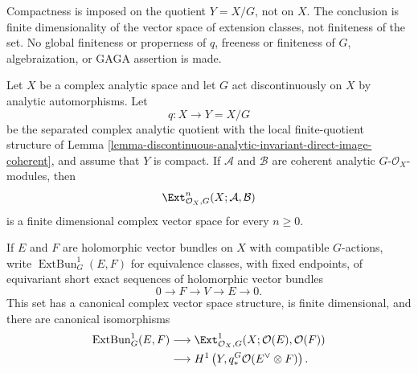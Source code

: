 \begin{lemma}
\label{lemma-compact-analytic-quotient-equivariant-ext-finite-dimensional}
\begin{reference}
\cite[Chapter V, \S 5.6, p. 219]{Tohoku}
\cite[Hauptsatz I, p. 57]{Grauert-direct-image}
\end{reference}
\begin{history}
Compactness is imposed on the quotient $Y=X/G$, not on $X$. The conclusion
is finite dimensionality of the vector space of extension classes, not
finiteness of the set. No global finiteness or properness of $q$, freeness or
finiteness of $G$, algebraization, or GAGA assertion is made.
\end{history}
Let $X$ be a complex analytic space and let $G$ act discontinuously on $X$
by analytic automorphisms. Let
$$
q:X\longrightarrow Y=X/G
$$
be the separated complex analytic quotient with the local finite-quotient
structure of Lemma
\ref{lemma-discontinuous-analytic-invariant-direct-image-coherent}, and
assume that $Y$ is compact. If $\mathcal A$ and $\mathcal B$ are coherent
analytic $G$-$\mathcal O_X$-modules, then
$$
\Ext^n_{\mathcal O_X,G}(X;\mathcal A,\mathcal B)
$$
is a finite dimensional complex vector space for every $n\geq 0$.

If $E$ and $F$ are holomorphic vector bundles on $X$ with compatible
$G$-actions, write $\operatorname{ExtBun}^1_G(E,F)$ for equivalence classes,
with fixed endpoints, of equivariant short exact sequences of holomorphic
vector bundles
$$
0\longrightarrow F\longrightarrow V\longrightarrow E\longrightarrow 0.
$$
This set has a canonical complex vector space structure, is finite
dimensional, and there are canonical isomorphisms
$$
\begin{aligned}
\operatorname{ExtBun}^1_G(E,F)
&\longrightarrow
\Ext^1_{\mathcal O_X,G}
  (X;\mathcal O(E),\mathcal O(F)) \\
&\longrightarrow
H^1\left(Y,q_*^G\mathcal O(E^\vee\otimes F)\right).
\end{aligned}
$$
\end{lemma}

